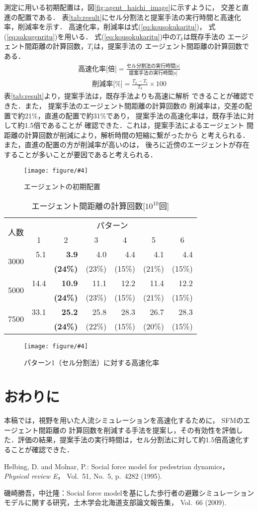 \documentclass{maelab_y}
\newcommand{\figtb}[5]{ %
\begin{figure}[hbtp]
  \begin{center}
    \texttt{[image: figure/\#4]}
    \caption{#1}
    \label{fig:#5}
  \end{center}
\end{figure}
}%
\newcommand{\分類条件}{%
\begin{table}[t]
\begin{center}
\caption{進行方向を分類する条件}
\ecaption{Classification condition of moving direction $e_{i}$.}
\label{tb:hantei_jouken}
\begin{tabular}{c|c|c|c|c}
\hline \hline
			& 右 & 左 & 上 & 下 \\ \hline
パターン2   & $\frac{1}{\sqrt{2}} < e_x \leq 1  $
		    & $ -1 \leq e_x < \frac{-1}{\sqrt{2}}$ 
		    & $ \frac{-1}{\sqrt{2}} < e_x < \frac{1}{\sqrt{2}} $ 
		    & $ \frac{-1}{2} < e_x < \frac{1}{2} $ \\
パターン3   & $\frac{-1}{2} < e_y < \frac{1}{2} $ 
		    & $\frac{-1}{2} < e_y < \frac{1}{2} $
            & $ \frac{1}{\sqrt{2}} < e_y \leq 1$
		    & $ -1 \leq e_y < \frac{-1}{\sqrt{2}} $ \\
\hline
\multirow{2}{*}{パターン4}   
			& $R_x \geq A_x$ & $R_x < A_x$ & $R_y \geq A_y$ & $R_y < A_y $ \\
	        &  $L_x \geq A_x$ & $L_x < A_x$ & $L_y \geq A_y$ & $L_y < A_y$ \\
\hline
\multirow{2}{*}{パターン5}   
 			& $R_x \geq x_1$ & $R_x < x_2$ & $R_y \geq y_1$ & $R_y < y_2 $ \\
			& $L_x \geq x_1$ & $L_x < x_2$ & $L_y \geq y_1$ & $L_y < y_2 $ \\
\hline
パターン6   & $ \cos(\frac{1}{2}\theta_{view}) \leq  e_y $ 
			& $ e_y \leq -\cos(\frac{1}{2}\theta_{view})$ 
			& $ \sin(\frac{1}{2}(\pi - \theta_{view})) \leq e_x $ 
			& $ e_x \leq \sin(\frac{1}{2}(\pi - \theta_{view}))  $ \\
\hline
\end{tabular}
\end{center}
\end{table}}%
\newcommand{\距離計算new}{%
  \begin{table}[hbtp]
    \begin{center}
    \caption{エージェント間距離の計算回数[$10^{10}$回]}
    \label{tab:my-table}
    \begin{tabular}{c|llllll}
    \hline \hline
    \multirow{2}{*}{人数}   & \multicolumn{6}{c}{パターン}                                                                                                                                                             \\ \cline{2-7} 
                          & \multicolumn{1}{c|}{1}    & \multicolumn{1}{c|}{2}               & \multicolumn{1}{c|}{3}      & \multicolumn{1}{c|}{4}      & \multicolumn{1}{c|}{5}      & \multicolumn{1}{c}{6}    \\ \hline
    \multirow{2}{*}{3000} & \multicolumn{1}{r|}{5.1}  & \multicolumn{1}{r|}{\textbf{3.9}}    & \multicolumn{1}{r|}{4.0}    & \multicolumn{1}{r|}{4.4}    & \multicolumn{1}{r|}{4.1}    & \multicolumn{1}{r}{4.4}  \\
                          & \multicolumn{1}{l|}{}     & \multicolumn{1}{l|}{\textbf{(24\%)}} & \multicolumn{1}{l|}{(23\%)} & \multicolumn{1}{l|}{(15\%)} & \multicolumn{1}{l|}{(21\%)} & (15\%)                   \\ \hline
    \multirow{2}{*}{5000} & \multicolumn{1}{r|}{14.4} & \multicolumn{1}{r|}{\textbf{10.9}}   & \multicolumn{1}{r|}{11.1}   & \multicolumn{1}{r|}{12.2}   & \multicolumn{1}{r|}{11.4}   & \multicolumn{1}{r}{12.2} \\
                          & \multicolumn{1}{l|}{}     & \multicolumn{1}{l|}{\textbf{(24\%)}} & \multicolumn{1}{l|}{(23\%)} & \multicolumn{1}{l|}{(15\%)} & \multicolumn{1}{l|}{(21\%)} & (15\%)                   \\ \hline
    \multirow{2}{*}{7500} & \multicolumn{1}{r|}{33.1} & \multicolumn{1}{r|}{\textbf{25.2}}   & \multicolumn{1}{r|}{25.8}   & \multicolumn{1}{r|}{28.3}   & \multicolumn{1}{r|}{26.7}   & \multicolumn{1}{r}{28.3} \\
                          & \multicolumn{1}{l|}{}     & \multicolumn{1}{l|}{\textbf{(24\%)}} & \multicolumn{1}{l|}{(22\%)} & \multicolumn{1}{l|}{(15\%)} & \multicolumn{1}{l|}{(20\%)} & (15\%)                   \\ \hline
    \end{tabular}
    \end{center}
    \end{table}
}%
\newcommand{\粒子数}{%
\begin{table}[hbtp]
  \begin{center}
    \caption{各配置の詳細}
    \label{tb:haichi_para}
    \begin{tabular}{c|c|c}
      \hline \hline
      & 教室 & 演習室 \\ \hline 
      エージェント数[人] & 96 & 204 \\ \hline
      壁粒子数[個] & 1037 & 1454\\ \hline
      経由地数[個] & 12   & 26 \\ \hline
      解析領域 & $50m\times50m$ & $50m\times50m$ \\ \hline
    \end{tabular}
  \end{center}
\end{table}
}%
\newcommand{\評価環境}{%
\begin{table}[hbtp]
  \begin{center}
    \caption{各配置の詳細}
    \label{tb:haichi_para}
    \begin{tabular}{c|c|c}
      \hline \hline
                 & マシン1                & マシン2 \\ \hline 
      CPU        & Intel Xeon E5-2687W & Intel Xeon E5-2667W \\ \hline
      メモリ     & 64GB                   & 64GB \\ \hline
      OS         & Linux 4.12.9            & Linux 6.5.8 \\ \hline
      コンパイラ & gcc 7.2.0             & gcc 13.2.0 \\ \hline
    \end{tabular}
  \end{center}
\end{table}
}%
\begin{document}
測定に用いる初期配置は，図\ref{fig:agent_haichi_image}に示すように，
交差と直進の配置である．
表\ref{tab:result}にセル分割法と提案手法の実行時間と高速化率，削減率を示す．
高速化率，削減率は式(\ref{eq:kousokukaritu})，
式(\ref{eq:sakugenritu})を用いる．
式(\ref{eq:kousokukaritu})中の$T_{k}$は既存手法の
エージェント間距離の計算回数，$T_{t}$は，提案手法の
エージェント間距離の計算回数である．
%
\begin{eqnarray}
  \label{eq:kousokukaritu}
  \mbox{高速化率[倍]} =
  \frac{\mbox{セル分割法の実行時間[s]}}{\mbox{提案手法の実行時間[s]}}
\end{eqnarray}
%
\begin{eqnarray}
  \label{eq:sakugenritu}
  \mbox{削減率[\%]} =
  \frac{T_{k} - T_{t}}{T_{k}} \times 100
\end{eqnarray}\vspace{1mm}
%
表\ref{tab:result}より，提案手法は，既存手法よりも高速に解析
できることが確認できた．また，
提案手法のエージェント間距離の計算回数の
削減率は，交差の配置で約21\%，直進の配置で約31\%であり，
提案手法の高速化率は，既存手法に対して約1.5倍であることが
確認できた．これは，提案手法によるエージェント
間距離の計算回数が削減により，解析時間の短縮に繋がったから
と考えられる．また，直進の配置の方が削減率が高いのは，
後ろに近傍のエージェントが存在することが多いことが要因であると考えられる．


\figtb{エージェントの初期配置}{Initial position of agents.}{7}{agent_position.eps}{agent_haichi}


\距離計算new
\figtb{パターン1（セル分割法）に対する高速化率}{}{8}{20230226_kousokuka.eps}{kousokuka2}

\section{おわりに}
本稿では，視野を用いた人流シミュレーションを高速化するために，
SFMのエージェント間距離の
計算回数を削減する手法を提案し，その有効性を評価した．評価の結果，提案手法の実行時間は，セル分割法に対して約1.5倍高速化することが確認できた．

\begin{thebibliography}{9}
\footnotesize
{}
  Helbing, D. and Molnar, P.: Social force model for pedestrian dynamics，{\em
    Physical review E}， Vol.~51, No.~5, p.\ 4282 (1995).

  磯崎勝吾，中辻隆：Social force
  modelを基にした歩行者の避難シミュレーションモデルに関する研究，土木学会北海道支部論文報告集，
  Vol.~66 (2009).
\end{thebibliography}
\end{document}
